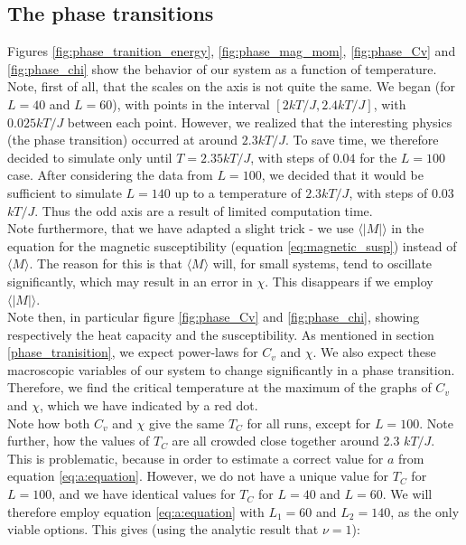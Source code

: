 \documentclass[a4paper, 10pt]{article}
\begin{document}
\subsection{The phase transitions}\label{discussion_phase_transition}
Figures \ref{fig:phase_tranition_energy}, \ref{fig:phase_mag_mom}, \ref{fig:phase_Cv} and \ref{fig:phase_chi} show the behavior of our system as a function of temperature. Note, first of all, that the scales on the axis is not quite the same. We began (for $L=40$ and $L=60$), with points in the interval $[2kT/J, 2.4kT/J]$, with $0.025 kT/J$ between each point. However, we realized that the interesting physics (the phase transition) occurred at around $2.3 kT/J$. To save time, we therefore decided to simulate only until $T=2.35 kT/J$, with steps of $0.04$ for the $L=100$ case. After considering the data from $L=100$, we decided that it would be sufficient to simulate $L=140$ up to a temperature of $2.3 kT/J$, with steps of 0.03 $kT/J$. Thus the odd axis are a result of limited computation time.\\
\linebreak
Note furthermore, that we have adapted a slight trick - we use $\langle |M|\rangle$ in the equation for the magnetic susceptibility (equation \ref{eq:magnetic_susp}) instead of $\langle M \rangle$. The reason for this is that $\langle M \rangle$ will, for small systems, tend to oscillate significantly, which may result in an error in $\chi$. This disappears if we employ $\langle |M|\rangle$.\\
\linebreak
Note then, in particular figure \ref{fig:phase_Cv} and \ref{fig:phase_chi}, showing respectively the heat capacity and the susceptibility. As mentioned in section \ref{phase_tranisition}, we expect power-laws for $C_v$ and $\chi$. We also expect these macroscopic variables  of our system to change significantly in a phase transition. Therefore, we find the critical temperature at the maximum of the graphs of $C_v$ and $\chi$, which we have indicated by a red dot.\\
\linebreak
Note how both $C_v$ and $\chi$ give the same $T_C$ for all runs, except for $L=100$. Note further, how the values of $T_C$ are all crowded close together around 2.3 $kT/J$. This is problematic, because in order to estimate a correct value for $a$ from equation \ref{eq:a:equation}. However, we do not have a unique value for $T_C$ for $L=100$, and we have identical values for $T_C$ for $L=40$ and $L=60$. We will therefore employ equation \ref{eq:a:equation} with $L_1=60$ and $L_2=140$, as the only viable options. This gives (using the analytic result that $\nu = 1$):
\end{document}
